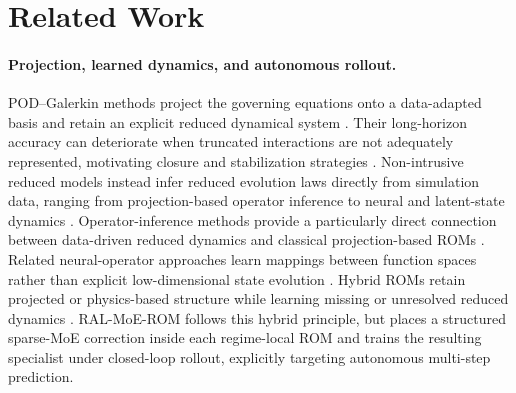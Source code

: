 \section{Related Work}
\paragraph{Projection, learned dynamics, and autonomous rollout.}
POD--Galerkin methods project the governing equations onto a data-adapted basis and retain an explicit reduced dynamical system \citep{sirovich1987,berkooz1993,benner2015}. Their long-horizon accuracy can deteriorate when truncated interactions are not adequately represented, motivating closure and stabilization strategies
\citep{amsallem2012}. Non-intrusive reduced models instead infer reduced evolution laws directly from simulation data, ranging from projection-based operator inference to neural and latent-state dynamics
\citep{peherstorfer2016,hesthaven2018,champion2019,lee2020, pan2024domain,park2024}. Operator-inference methods provide a particularly direct connection between data-driven reduced dynamics and classical projection-based ROMs \citep{kramer2024}. Related neural-operator approaches learn mappings between function spaces
rather than explicit low-dimensional state evolution \citep{lu2021,kovachki2023}. Hybrid ROMs retain projected or physics-based structure while learning missing or unresolved reduced dynamics \citep{duraisamy2019,brunton2020,fresca2022,dar2023,geelen2023,manti2025}. RAL-MoE-ROM follows this hybrid principle, but places a structured sparse-MoE correction inside each regime-local ROM and trains the resulting specialist under closed-loop rollout, explicitly targeting autonomous multi-step prediction.




